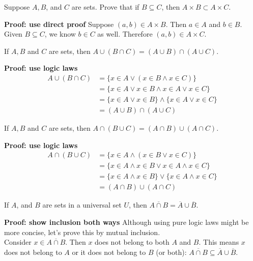 \documentclass{article}
\begin{document}
\begin{problem}
Suppose $A, B$, and $C$ are sets. Prove that if $B \subseteq C$, then $A \times B \subset A \times C$.
\end{problem}
\textbf{Proof: use direct proof}
Suppose $(a, b) \in A \times B$. Then $a \in A$ and $b \in B$. Given $B \subseteq C$, we know $b \in C$ as well. Therefore $(a, b) \in A \times C$.

\begin{problem}
If $A, B$ and $C$ are sets, then $A \cup (B \cap C) = (A \cup B) \cap (A \cup C)$.
\end{problem}
\textbf{Proof: use logic laws}
\begin{align*}
    A \cup (B \cap C) & = \{x \in A \lor (x \in B \land x \in C)\}                \\
                      & = \{x \in A \lor x \in B \land x \in A \lor x \in C\}     \\
                      & = \{x \in A \lor x \in B\} \land \{x \in A \lor x \in C\} \\
                      & = (A \cup B) \cap (A \cup C)
\end{align*}

\begin{problem}
If $A, B$ and $C$ are sets, then $A \cap (B \cup C) = (A \cap B) \cup (A \cap C)$.
\end{problem}
\textbf{Proof: use logic laws}
\begin{align*}
    A \cap (B \cup C) & = \{x \in A \land (x \in B \lor x \in C)\}                 \\
                      & = \{x \in A \land x \in B \lor x \in A \land x \in C\}     \\
                      & = \{x \in A \land x \in B\} \lor \{x \in A \land x \in C\} \\
                      & = (A \cap B) \cup (A \cap C)
\end{align*}

\begin{problem}
If $A$, and $B$ are sets in a universal set $U$, then $\overline{A \cap B} = \overline{A} \cup \overline{B}$.
\end{problem}
\textbf{Proof: show inclusion both ways}
Although using pure logic laws might be more concise, let's prove this by mutual inclusion.
\\

Consider $x \in \overline{A \cap B}$. Then $x$ does not belong to both $A$ and $B$. This means $x$ does not belong to $A$ or it does not belong to $B$ (or both): $\overline{A \cap B} \subseteq \overline{A} \cup \overline{B}$.
\\
\end{document}
